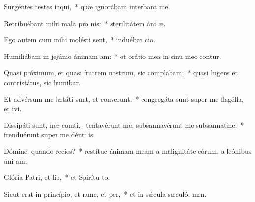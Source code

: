 \item Surgéntes testes inqui,~* quæ ignorábam interbant me.
\item Retribuébant mihi mala pro nis:~* sterilitátem áni æ.
\item Ego autem cum mihi molésti sent,~* induébar cio.
\item Humiliábam in jejúnio ánimam am:~* et orátio mea in sinu meo contur.
\item Quasi próximum, et quasi fratrem nostrum, sic complabam:~* quasi lugens et contristátus, sic humibar.
\item Et advérsum me lætáti sunt, et converunt:~* congregáta sunt super me flagélla, et ivi.
\item Dissipáti sunt, nec comti,~\pscross{} tentavérunt me, subsannavérunt me subsannatine:~* frenduérunt super me dénti is.
\item Dómine, quando recies?~* restítue ánimam meam a malignitáte eórum, a leónibus úni am.
\item Glória Patri, et lio,~* et Spirítu to.
\item Sicut erat in princípio, et nunc, et per,~* et in sǽcula sæculó. men.
